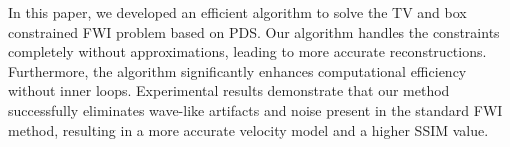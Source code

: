In this paper, we developed an efficient algorithm to solve the TV and box constrained FWI problem based on PDS.
Our algorithm handles the constraints completely without approximations, leading to more accurate reconstructions.
Furthermore, the algorithm significantly enhances computational efficiency without inner loops.
Experimental results demonstrate that our method successfully eliminates wave-like artifacts and noise present in the standard FWI method, resulting in a more accurate velocity model and a higher SSIM value.
